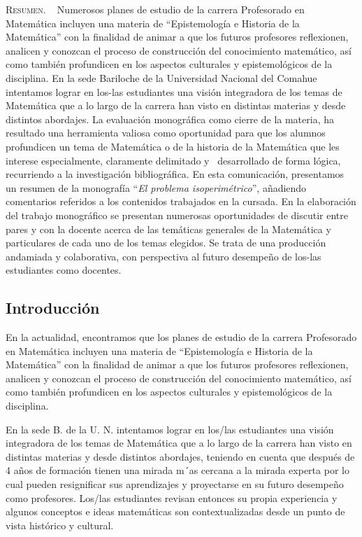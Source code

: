 \begin{center}
	\begin{minipage}{0.75\linewidth} \small
		\textsc{Resumen}. ~
		Numerosos planes de estudio de la carrera Profesorado en Matemática incluyen una materia de “Epistemología e Historia de la Matemática” con la finalidad de animar a que los futuros profesores reflexionen, analicen y conozcan el proceso de construcción del conocimiento matemático, así como también profundicen en los aspectos culturales y epistemológicos de la disciplina. En la sede Bariloche de la Universidad Nacional del Comahue intentamos lograr en los-las estudiantes una visión integradora de los temas de Matemática que a lo largo de la carrera han visto en distintas materias y desde distintos abordajes. La evaluación monográfica como cierre de la materia, ha resultado una herramienta valiosa como oportunidad para que los alumnos profundicen un tema de Matemática o de la historia de la Matemática que les interese especialmente, claramente delimitado y  desarrollado de forma lógica, recurriendo a la investigación bibliográfica. En esta comunicación, presentamos un resumen de la monografía “\textit{El problema isoperimétrico}”, añadiendo comentarios referidos a los contenidos trabajados en la cursada. En la elaboración del trabajo monográfico se presentan numerosas oportunidades de discutir entre pares y con la docente acerca de las temáticas generales de la Matemática y particulares de cada uno de los temas elegidos. Se trata de una producción andamiada y colaborativa, con perspectiva al futuro desempeño de los-las estudiantes como docentes.
	\end{minipage}
\end{center}

\subsection{Introducción}

En la actualidad, encontramos que los planes de estudio de la carrera Profesorado en Matemática incluyen una materia de “Epistemología e Historia de la Matemática” con la finalidad de animar a que los futuros profesores reflexionen, analicen y conozcan el proceso de construcción del conocimiento matemático, así como también profundicen en los aspectos culturales y epistemológicos de la disciplina.

En la sede B. de la U. N. intentamos lograr en los/las estudiantes una visión integradora de los temas de Matemática que a lo largo de la carrera han visto en distintas materias y desde distintos abordajes, teniendo en cuenta que después de 4 años de formación tienen una mirada m´as cercana a la mirada experta por lo cual pueden resignificar sus aprendizajes y proyectarse en su futuro desempeño como profesores. Los/las estudiantes revisan entonces su propia experiencia y algunos conceptos e ideas matemáticas son contextualizadas desde un punto de vista histórico y cultural.

